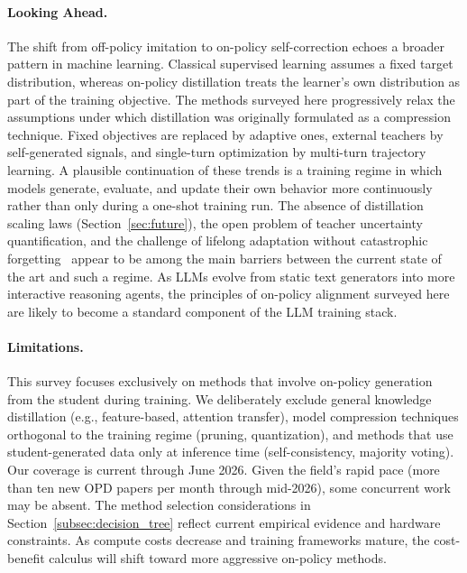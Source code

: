 \documentclass{article} %
\begin{document}
\paragraph{Looking Ahead.} The shift from off-policy imitation to on-policy self-correction echoes a broader pattern in machine learning. Classical supervised learning assumes a fixed target distribution, whereas on-policy distillation treats the learner's own distribution as part of the training objective. The methods surveyed here progressively relax the assumptions under which distillation was originally formulated as a compression technique. Fixed objectives are replaced by adaptive ones, external teachers by self-generated signals, and single-turn optimization by multi-turn trajectory learning. A plausible continuation of these trends is a training regime in which models generate, evaluate, and update their own behavior more continuously rather than only during a one-shot training run. The absence of distillation scaling laws (Section~\ref{sec:future}), the open problem of teacher uncertainty quantification, and the challenge of lifelong adaptation without catastrophic forgetting~\citep{1612.00796} appear to be among the main barriers between the current state of the art and such a regime. As LLMs evolve from static text generators into more interactive reasoning agents, the principles of on-policy alignment surveyed here are likely to become a standard component of the LLM training stack.

\paragraph{Limitations.} This survey focuses exclusively on methods that involve on-policy generation from the student during training. We deliberately exclude general knowledge distillation (e.g., feature-based, attention transfer), model compression techniques orthogonal to the training regime (pruning, quantization), and methods that use student-generated data only at inference time (self-consistency, majority voting). Our coverage is current through June 2026. Given the field's rapid pace (more than ten new OPD papers per month through mid-2026), some concurrent work may be absent. The method selection considerations in Section~\ref{subsec:decision_tree} reflect current empirical evidence and hardware constraints. As compute costs decrease and training frameworks mature, the cost-benefit calculus will shift toward more aggressive on-policy methods.
\end{document}
